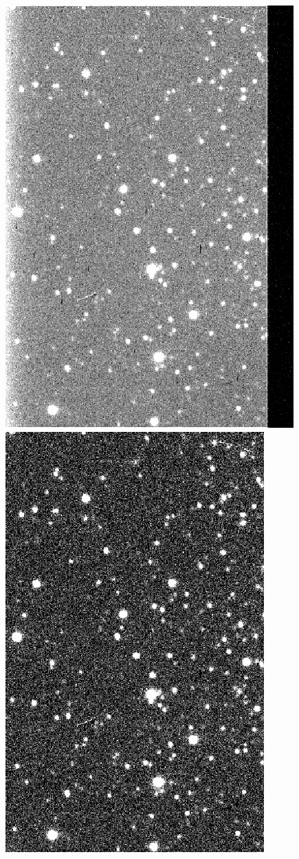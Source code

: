 \documentclass[12pt]{article}
\begin{document}
\begin{figure}[H]
  \centering
   \includegraphics[scale= 0.35]{noRed.png}
      \includegraphics[scale= 0.35]{redA.png}

\end{figure}
\end{document}
